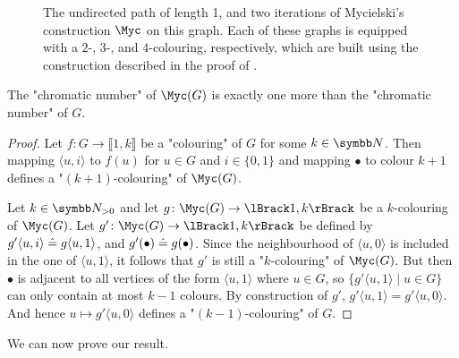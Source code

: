 \begin{figure}
	\centering
	\begin{tikzpicture}
		
	\end{tikzpicture}
	\caption{
		\AP\label{fig:Mycielski}
		The undirected path of length 1,
		and two iterations of Mycielski's construction $\Myc$ on this graph.
		Each of these graphs is equipped with a $2$-, $3$-, and $4$-colouring, respectively, 
		which are built using the construction described in the proof
		of .
	}
\end{figure}

\begin{property}
	\label{prop:chromatic-number}
	The "chromatic number" of $\Myc(G)$
	is exactly one more than the "chromatic number" of $G$.
\end{property}

\begin{proof}
  Let $f\colon G \to \lBrack 1,k \rBrack$ be a "colouring" of $G$ for some $k\in \N$.
  Then mapping $\langle u, i \rangle$ to $f(u)$ for $u \in G$ and $i \in \{0,1\}$
  and mapping $\bullet$ to colour $k+1$ defines a "$(k+1)$-colouring" of $\Myc(G)$.

  Let $k \in \Np$ and let $g\colon \Myc(G) \to \lBrack 1,k\rBrack$ be a
  $k$-colouring of $\Myc(G)$.
  Let $g'\colon \Myc(G) \to \lBrack 1,k\rBrack$
  be defined by $g'\langle u,i\rangle \defeq g\langle u,1 \rangle$,
  and $g'(\bullet) \defeq g(\bullet)$.
  Since the neighbourhood of $\langle u,0 \rangle$ is included in the
  one of $\langle u,1 \rangle$, it follows that $g'$ is still a "$k$-colouring"
  of $\Myc(G)$. But then $\bullet$ is adjacent to all vertices of the form $\langle u, 1\rangle$
  where $u\in G$, so $\{g'\langle u, 1\rangle \mid u \in G\}$ can only contain at most $k-1$ colours.
  By construction of $g'$, $g'\langle u, 1\rangle = g'\langle u, 0\rangle$.
  And hence $u \mapsto g' \langle u,0 \rangle$ defines a "$(k-1)$-colouring" of $G$.
\end{proof}

We can now prove our result.

